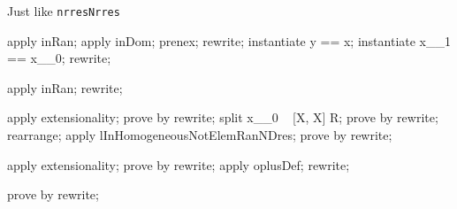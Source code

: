Just like \texttt{nrresNrres}


\begin{LPScript}\begin{forget}[lInHomogeneousElemRanNDres]
apply inRan;
apply inDom;
prenex;
rewrite;
instantiate y == x;
instantiate x\_\_1 == x\_\_0;
rewrite;
\end{forget}\end{LPScript}

\begin{LPScript}\begin{forget}[lInHomogeneousNotElemRanNDres]
apply inRan;
rewrite;
\end{forget}\end{LPScript}


\begin{LPScript}\begin{forget}[lHomoheneousUnionRanNDres]
apply extensionality;
prove by rewrite;
split x\_\_0 \in  \ran~ [X, X] R;
prove by rewrite;
rearrange;
apply lInHomogeneousNotElemRanNDres;
prove by rewrite;
\end{forget}\end{LPScript}

\begin{LPScript}\begin{forget}[lUnitOplusAbsorbsUnitNDres]
apply extensionality;
prove by rewrite;
apply oplusDef;
rewrite;
\end{forget}\end{LPScript}

\begin{LPScript}\begin{forget}[lNDresExchange]
prove by rewrite;
\end{forget}\end{LPScript}

